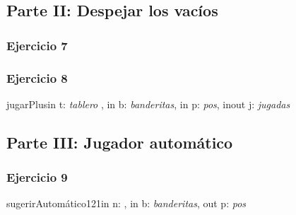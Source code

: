 \documentclass[a4paper]{article}
\begin{document}
\newpage
\subsection{Parte II: Despejar los vac\'ios}
\subsubsection{Ejercicio 7}
\begin{addmargin}[4em]{1em}
\end{addmargin}

\subsubsection{Ejercicio 8}
\begin{addmargin}[4em]{1em}
\begin{proc}{jugarPlus}{in t: \textit{tablero} , in b: \textit{banderitas},
	                    in p: \textit{pos},
	                    inout j: \textit{jugadas}}{}

\end{proc}
\end{addmargin}


\newpage
\subsection{Parte III: Jugador autom\'atico}
\subsubsection{Ejercicio 9}
\begin{addmargin}[4em]{1em}
\begin{proc}{sugerirAutom\'atico121}{in n: \ent , in b: \textit{banderitas},
	                                 out p: \textit{pos}}{}

\end{proc}
\end{addmargin}
\end{document}
